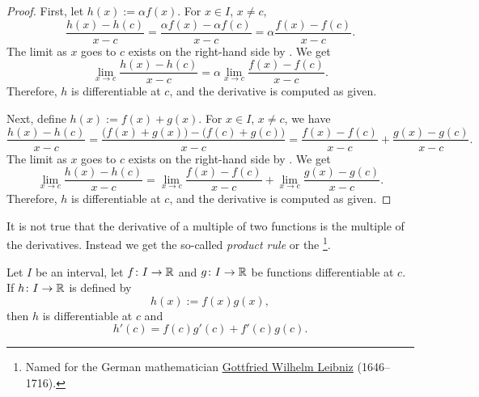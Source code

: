 \begin{proof}
First, let $h(x) := \alpha f(x)$.
For $x \in I$, $x \not= c$,
\begin{equation*}
\frac{h(x)-h(c)}{x-c} =
\frac{\alpha f(x) - \alpha f(c)}{x-c}
=
\alpha \frac{f(x) - f(c)}{x-c} .
\end{equation*}
The limit as $x$ goes to $c$ exists on the right-hand side
by .  We get
\begin{equation*}
\lim_{x\to c}\frac{h(x)-h(c)}{x-c} =
\alpha \lim_{x\to c} \frac{f(x) - f(c)}{x-c} .
\end{equation*}
Therefore, $h$ is differentiable at $c$,
and the derivative is computed as given.

Next, define $h(x) := f(x)+g(x)$.
For $x \in I$, $x \not= c$, we have
\begin{equation*}
\frac{h(x)-h(c)}{x-c} =
\frac{\bigl(f(x) + g(x)\bigr) - \bigl(f(c) + g(c)\bigr)}{x-c}
=
\frac{f(x) - f(c)}{x-c}
+
\frac{g(x) - g(c)}{x-c} .
\end{equation*}
The limit as $x$ goes to $c$ exists on the right-hand side
by .  We get
\begin{equation*}
\lim_{x\to c}\frac{h(x)-h(c)}{x-c} =
\lim_{x\to c} \frac{f(x) - f(c)}{x-c}
+
\lim_{x\to c}\frac{g(x) - g(c)}{x-c} .
\end{equation*}
Therefore, $h$ is differentiable at $c$,
and the derivative is computed as given.
\end{proof}

It is not true that the derivative of a multiple of two functions is
the multiple of the derivatives.  Instead we get the so-called \emph{product
rule} or the \emph{}%
\footnote{Named for the German mathematician
\href{https://en.wikipedia.org/wiki/Leibniz}{Gottfried Wilhelm Leibniz}
(1646--1716).}.

\begin{prop}
Let $I$ be an interval, let
$f \colon I \to {\mathbb{R}}$ and $g \colon I \to {\mathbb{R}}$ be 
functions differentiable at $c$.  If $h \colon I \to {\mathbb{R}}$
is defined by
\begin{equation*}
h(x) := f(x) g(x) ,
\end{equation*}
then $h$ is differentiable at $c$ and
\begin{equation*}
h'(c) = f(c) g'(c) + f'(c) g(c) .
\end{equation*}
\end{prop}

